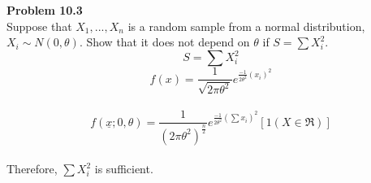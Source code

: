 
{\bf Problem 10.3}
\\ Suppose that $ X_{1},...,X_{n} $ is a random sample from a normal distribution, 
\\ $ X_{i} \sim N(0, \theta ). $ Show that it does not depend on $ \theta $ if $ S=\sum X_{i}^{2}. $  
\\ \[ S= \sum X_{i}^{2}\] \[ f(x)=\dfrac{1}{\sqrt{2 \pi \theta^{2}}}e^{ \frac{-1}{2 \theta^{2}}( x_{i})^{2}} \]
\\ \[ f( \underline{x} ;0, \theta )= \dfrac{1}{(2 \pi \theta^{2})^{\frac{n}{2}}}e^{\frac{-1}{2 \theta^{2}}(\sum x_{i})^{2}}[1(X \in \Re)] \] 
\\ Therefore, $ \sum X_{i}^{2} $ is sufficient.
